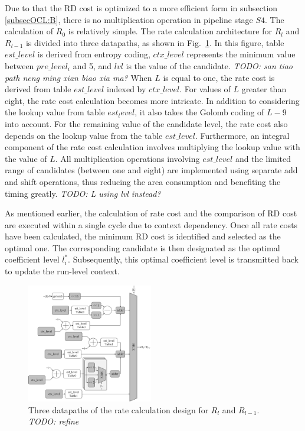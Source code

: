 \documentclass[lettersize,journal]{IEEEtran}
\begin{document}
Due to that the RD cost is optimized to a more efficient form in subsection \ref{subsecOCL:B}, there is no multiplication operation in pipeline stage $S4$. The calculation of $R_{0}$ is relatively simple. The rate calculation architecture for $R_{l}$ and $R_{l-1}$ is divided into three datapaths, as shown in Fig.~\ref{rate cost}. 
In this figure, table $est\_level$ is derived from entropy coding, $ctx\_level$ represents the minimum value between $pre\_level_i$ and 5, and $lvl$ is the value of the candidate. \emph{TODO: san tiao path neng ming xian biao xia ma?}
When $L$ is equal to one, the rate cost is derived from table $est\_level$ indexed by $ctx\_level$. 
For values of $L$ greater than eight, the rate cost calculation becomes more intricate. 
In addition to considering the lookup value from table $est_level$, it also takes the Golomb coding of $L-9$ into account. 
For the remaining value of the candidate level, the rate cost also depends on the lookup value from the table $est\_level$. Furthermore, an integral component of the rate cost calculation involves multiplying the lookup value with the value of $L$. All multiplication operations involving $est\_level$ and the limited range of candidates (between one and eight) are implemented using separate add and shift operations, thus reducing the area consumption and benefiting the timing greatly. \emph{TODO: L using lvl instead?}

As mentioned earlier, the calculation of rate cost and the comparison of RD cost are executed within a single cycle due to context dependency. Once all rate costs have been calculated, the minimum RD cost is identified and selected as the optimal one. The corresponding candidate is then designated as the optimal coefficient level $l_{i}^{*}$. Subsequently, this optimal coefficient level is transmitted back to update the run-level context. 

\begin{figure}[!h]
	\centering
	\centerline{\includegraphics[width=0.49\textwidth]{pic_pan/rate_calculation.png}} 
	\caption{Three datapaths of the rate calculation design for $R_{l}$ and $R_{l-1}$. \emph{TODO: refine }}
	\label{rate cost} %
\end{figure}
\end{document}
